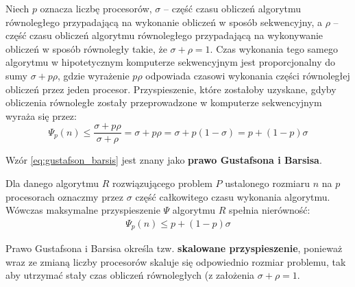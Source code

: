 Niech \(p\) oznacza liczbę procesorów, \(\sigma\) -- część czasu obliczeń algorytmu równoległego przypadającą na wykonanie obliczeń w sposób sekwencyjny, a \(\rho\) -- część czasu obliczeń algorytmu równoległego przypadającą na wykonywanie obliczeń w sposób równoległy takie, że \(\sigma+\rho=1\). Czas wykonania tego samego algorytmu w hipotetycznym komputerze sekwencyjnym jest proporcjonalny do sumy \(\sigma + p\rho\), gdzie wyrażenie \(p\rho\) odpowiada czasowi wykonania części równoległej obliczeń przez jeden procesor. Przyspieszenie, które zostałoby uzyskane, gdyby obliczenia równoległe zostały przeprowadzone w komputerze sekwencyjnym wyraża się przez:
\begin{equation}\label{eq:gustafson_barsis}
\Psi_{p}(n)\leq\frac{\sigma+p\rho}{\sigma+\rho}=\sigma+p\rho=\sigma+p\left(1-\sigma\right)=p+\left(1-p\right)\sigma
\end{equation}

Wzór \eqref{eq:gustafson_barsis} jest znany jako \textbf{prawo Gustafsona i	Barsisa}. 

\begin{definicja}
Dla danego algorytmu \(R\) rozwiązującego problem \(P\) ustalonego rozmiaru \(n\) na \(p\) procesorach oznaczmy przez \(\sigma\) część całkowitego czasu wykonania algorytmu. Wówczas maksymalne przyspieszenie \(\Psi\) algorytmu \(R\) spełnia nierówność:
\begin{align*}
\Psi_{p}(n) \leq p + (1-p)\sigma
\end{align*}
\end{definicja}
\begin{uwaga}
Prawo Gustafsona i Barsisa określa tzw. \textbf{skalowane przyspieszenie}, ponieważ wraz ze zmianą liczby procesorów skaluje się odpowiednio rozmiar problemu, tak aby utrzymać stały czas obliczeń równoległych (z założenia \(\sigma + \rho = 1\)\cite{Czech}.
\end{uwaga}